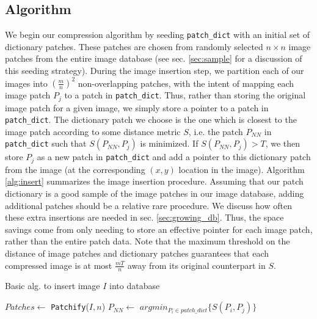 \subsection{Algorithm} \label{sec:alg}

We begin our compression algorithm by seeding \texttt{patch\_dict} with an initial set of dictionary patches.  These patches are chosen from randomly selected $n \times n$ image patches from the entire image database (see sec. \ref{sec:sample} for a discussion of this seeding strategy).   During the image insertion step, we partition each of our images into $\left(\frac{m}{n}\right)^2$ non-overlapping patches, with the intent of mapping each image patch $P_j$ to a patch in \texttt{patch\_dict}.  Thus, rather than storing the original image patch for a given image, we simply store a pointer to a patch in \texttt{patch\_dict}.  The dictionary patch we choose is the one which is closest to the image patch according to some distance metric $S$, i.e. the patch $P_{NN}$ in \texttt{patch\_dict} such that $S(P_{NN}, P_j)$ is minimized.  If $S(P_{NN}, P_j) > T$, we then store $P_j$ as a new patch in \texttt{patch\_dict} and add a pointer to this dictionary patch from the image (at the corresponding $(x,y)$ location in the image).  Algorithm \ref{alg:insert} summarizes the image insertion procedure. Assuming that our patch dictionary is a good sample of the image patches in our image database, adding additional patches should be a relative rare procedure.  We discuss how often these extra insertions are needed in sec. \ref{sec:growing_db}. Thus, the space savings come from only needing to store an effective pointer for each image patch, rather than the entire patch data.  Note that the maximum threshold on the distance of image patches and dictionary patches guarantees that each compressed image is at most $\frac{mT}{n}$ away from its original counterpart in $S$.

\begin{algorithm}
    \caption{Basic alg. to insert image $I$ into database}
    \label{alg:insert}
\begin{algorithmic}[1]
\State $Patches \leftarrow $ \texttt{Patchify}($I,n$)
\State $P_{NN} \leftarrow $ $argmin_{P_i \in patch\_dict} \{ S(P_i, P_j) \}$
\EndIf
\EndFor
\vspace{3mm}
\end{algorithmic}
\end{algorithm}

